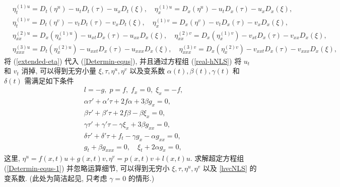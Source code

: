 \begin{equation}\label{extended-eta}
\begin{aligned}
&\eta_t^{(1)u}=D_t(\eta^u)-u_tD_t(\tau)-u_xD_t(\xi),\quad \eta_x^{(1)u}=D_x(\eta^u)-u_tD_x(\tau)-u_xD_x(\xi),\\
&\eta_t^{(1)v}=D_t(\eta^v)-v_tD_t(\tau)-v_xD_t(\xi),\quad \eta_x^{(1)v}=D_x(\eta^v)-v_tD_x(\tau)-v_xD_x(\xi),\\
&\eta_{xx}^{(2)u}=D_x(\eta_x^{(1)u})-u_{xt}D_x(\tau)-u_{xx}D_x(\xi),\quad \eta_{xx}^{(2)v}=D_x(\eta_x^{(1)v})-v_{xt}D_x(\tau)-v_{xx}D_x(\xi),\\ &\eta_{xxx}^{(3)u}=D_t(\eta_x^{(2)u})-u_{xxt}D_x(\tau)-u_{xxx}D_x(\xi),\quad \eta_{xxx}^{(3)v}=D_x(\eta_x^{(2)v})-v_{xxt}D_x(\tau)-v_{xxx}D_x(\xi),
\end{aligned}
\end{equation}
将 (\ref{extended-eta}) 代入 (\ref{Determin-equs}), 并且通过方程组 (\ref{real-hNLS}) 将 $u_t$ 和 $v_t$ 消掉, 可以得到无穷小量 $\xi, \tau, \eta^u, \eta^v$ 以及变系数  $\alpha(t), \beta(t), \gamma(t)$ 和 $\delta(t)$ 需满足如下条件
\begin{equation}\label{Determin-equs-1}
\begin{aligned}
&l=-g,\; p=f,\; f_x=0,\; \xi_x=-f,\\
&\alpha\tau'+\alpha'\tau+2f\alpha+3\beta g_x=0,\\
&\beta\tau'+\beta'\tau+2f\beta-\beta\xi_x=0,\\
&\gamma\tau'+\gamma'\tau-\gamma\xi_x+3\beta g_{xx}=0,\\
&\delta\tau'+\delta'\tau+f_t-\gamma g_x-\alpha g_{xx}=0,\\
&g_t+\beta g_{xxx}=0,\quad \xi_t+2\alpha g_x=0,
\end{aligned}
\end{equation}
这里, $\eta^u=f(x,t)u+g(x,t)v, \eta^v=p(x,t)v+l(x,t)u$.
求解超定方程组 (\ref{Determin-equs-1}) 并忽略运算细节, 可以得到无穷小
$\xi, \tau, \eta^u, \eta^v$ 以及 \eqref{hvcNLS} 的变系数. (此处为简洁起见, 只考虑 $\gamma=0$ 的情形.)

